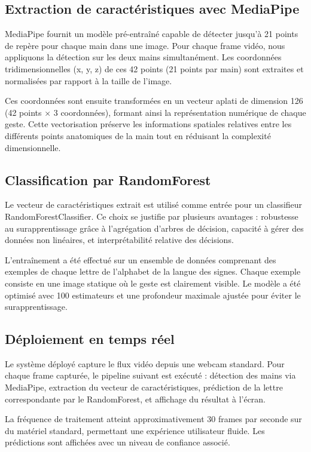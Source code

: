 \documentclass[twocolumn]{el-author}
\begin{document}
\subsection{Extraction de caractéristiques avec MediaPipe}

MediaPipe fournit un modèle pré-entraîné capable de détecter jusqu'à 21 points de repère pour chaque main dans une image. Pour chaque frame vidéo, nous appliquons la détection sur les deux mains simultanément. Les coordonnées tridimensionnelles (x, y, z) de ces 42 points (21 points par main) sont extraites et normalisées par rapport à la taille de l'image.

Ces coordonnées sont ensuite transformées en un vecteur aplati de dimension 126 (42 points × 3 coordonnées), formant ainsi la représentation numérique de chaque geste. Cette vectorisation préserve les informations spatiales relatives entre les différents points anatomiques de la main tout en réduisant la complexité dimensionnelle.

\subsection{Classification par RandomForest}

Le vecteur de caractéristiques extrait est utilisé comme entrée pour un classifieur RandomForestClassifier. Ce choix se justifie par plusieurs avantages : robustesse au surapprentissage grâce à l'agrégation d'arbres de décision, capacité à gérer des données non linéaires, et interprétabilité relative des décisions.

L'entraînement a été effectué sur un ensemble de données comprenant des exemples de chaque lettre de l'alphabet de la langue des signes. Chaque exemple consiste en une image statique où le geste est clairement visible. Le modèle a été optimisé avec 100 estimateurs et une profondeur maximale ajustée pour éviter le surapprentissage.

\subsection{Déploiement en temps réel}

Le système déployé capture le flux vidéo depuis une webcam standard. Pour chaque frame capturée, le pipeline suivant est exécuté : détection des mains via MediaPipe, extraction du vecteur de caractéristiques, prédiction de la lettre correspondante par le RandomForest, et affichage du résultat à l'écran.

La fréquence de traitement atteint approximativement 30 frames par seconde sur du matériel standard, permettant une expérience utilisateur fluide. Les prédictions sont affichées avec un niveau de confiance associé.
\end{document}
